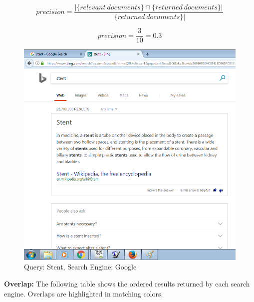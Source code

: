 \documentclass[a4paper, 11pt]{article}
\begin{document}
$$ 
precision = \frac{|\{relevant\ documents\} \cap \{returned\ documents\}|}{|\{returned\ documents\}|}
$$

$$ 
precision = \frac{3}{10} = 0.3
$$

\begin{figure}[h]
\caption{Query: Stent, Search Engine: Google}
\centering
\includegraphics[scale=0.7]{Q1/stent_Bing.png}
\end{figure}

\textbf{Overlap:}
The following table shows the ordered results returned by each search engine. Overlaps are highlighted in matching colors.
\end{document}

